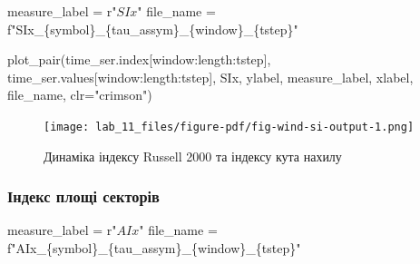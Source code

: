 \documentclass[
  letterpaper,
]{report}
\newenvironment{Shaded}{\begin{snugshade}}{\end{snugshade}}
\newcommand{\NormalTok}[1]{\textcolor[rgb]{0.00,0.23,0.31}{#1}}
\newcommand{\OperatorTok}[1]{\textcolor[rgb]{0.37,0.37,0.37}{#1}}
\newcommand{\SpecialCharTok}[1]{\textcolor[rgb]{0.37,0.37,0.37}{#1}}
\newcommand{\SpecialStringTok}[1]{\textcolor[rgb]{0.13,0.47,0.30}{#1}}
\newcommand{\StringTok}[1]{\textcolor[rgb]{0.13,0.47,0.30}{#1}}
\newcommand{\VerbatimStringTok}[1]{\textcolor[rgb]{0.13,0.47,0.30}{#1}}
\begin{document}
\begin{Shaded}
\begin{Highlighting}[]
\NormalTok{measure\_label }\OperatorTok{=} \VerbatimStringTok{r"$SIx$"}
\NormalTok{file\_name }\OperatorTok{=} \SpecialStringTok{f"SIx\_}\SpecialCharTok{\{}\NormalTok{symbol}\SpecialCharTok{\}}\SpecialStringTok{\_}\SpecialCharTok{\{}\NormalTok{tau\_assym}\SpecialCharTok{\}}\SpecialStringTok{\_}\SpecialCharTok{\{}\NormalTok{window}\SpecialCharTok{\}}\SpecialStringTok{\_}\SpecialCharTok{\{}\NormalTok{tstep}\SpecialCharTok{\}}\SpecialStringTok{"}
\end{Highlighting}
\end{Shaded}

\begin{Shaded}
\begin{Highlighting}[]
\NormalTok{plot\_pair(time\_ser.index[window:length:tstep],}
\NormalTok{          time\_ser.values[window:length:tstep],}
\NormalTok{          SIx, }
\NormalTok{          ylabel, }
\NormalTok{          measure\_label,}
\NormalTok{          xlabel,}
\NormalTok{          file\_name, }
\NormalTok{          clr}\OperatorTok{=}\StringTok{"crimson"}\NormalTok{)}
\end{Highlighting}
\end{Shaded}

\begin{figure}[H]

{\centering \texttt{[image: lab\_11\_files/figure-pdf/fig-wind-si-output-1.png]}

}

\caption{\label{fig-wind-si}Динаміка індексу Russell 2000 та індексу
кута нахилу}

\end{figure}

\hypertarget{ux456ux43dux434ux435ux43aux441-ux43fux43bux43eux449ux456-ux441ux435ux43aux442ux43eux440ux456ux432}{%
\subsubsection{Індекс площі
секторів}\label{ux456ux43dux434ux435ux43aux441-ux43fux43bux43eux449ux456-ux441ux435ux43aux442ux43eux440ux456ux432}}

\begin{Shaded}
\begin{Highlighting}[]
\NormalTok{measure\_label }\OperatorTok{=} \VerbatimStringTok{r"$AIx$"}
\NormalTok{file\_name }\OperatorTok{=} \SpecialStringTok{f"AIx\_}\SpecialCharTok{\{}\NormalTok{symbol}\SpecialCharTok{\}}\SpecialStringTok{\_}\SpecialCharTok{\{}\NormalTok{tau\_assym}\SpecialCharTok{\}}\SpecialStringTok{\_}\SpecialCharTok{\{}\NormalTok{window}\SpecialCharTok{\}}\SpecialStringTok{\_}\SpecialCharTok{\{}\NormalTok{tstep}\SpecialCharTok{\}}\SpecialStringTok{"}
\end{Highlighting}
\end{Shaded}
\end{document}
